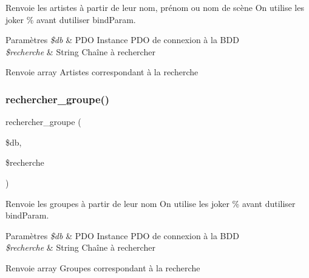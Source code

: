 Renvoie les artistes à partir de leur nom, prénom ou nom de scène On utilise les joker \% avant d\textquotesingle{}utiliser bind\+Param. 


\begin{DoxyParams}{Paramètres}
{\em \$db} & P\+DO Instance P\+DO de connexion à la B\+DD \\
\hline
{\em \$recherche} & String Chaîne à rechercher \\
\hline
\end{DoxyParams}
\begin{DoxyReturn}{Renvoie}
array Artistes correspondant à la recherche 
\end{DoxyReturn}
\mbox{\label{fonctionRecherche_8php_ad698711d776696b07caa7e2fb02ff453}} 
\subsubsection{\texorpdfstring{rechercher\+\_\+groupe()}{rechercher\_groupe()}}
{\footnotesize\ttfamily rechercher\+\_\+groupe (\begin{DoxyParamCaption}\item[{}]{\$db,  }\item[{}]{\$recherche }\end{DoxyParamCaption})}



Renvoie les groupes à partir de leur nom On utilise les joker \% avant d\textquotesingle{}utiliser bind\+Param. 


\begin{DoxyParams}{Paramètres}
{\em \$db} & P\+DO Instance P\+DO de connexion à la B\+DD \\
\hline
{\em \$recherche} & String Chaîne à rechercher \\
\hline
\end{DoxyParams}
\begin{DoxyReturn}{Renvoie}
array Groupes correspondant à la recherche 
\end{DoxyReturn}
\mbox{\label{fonctionRecherche_8php_a217c5282b202927aea5a37d860a5fdbc}} 
